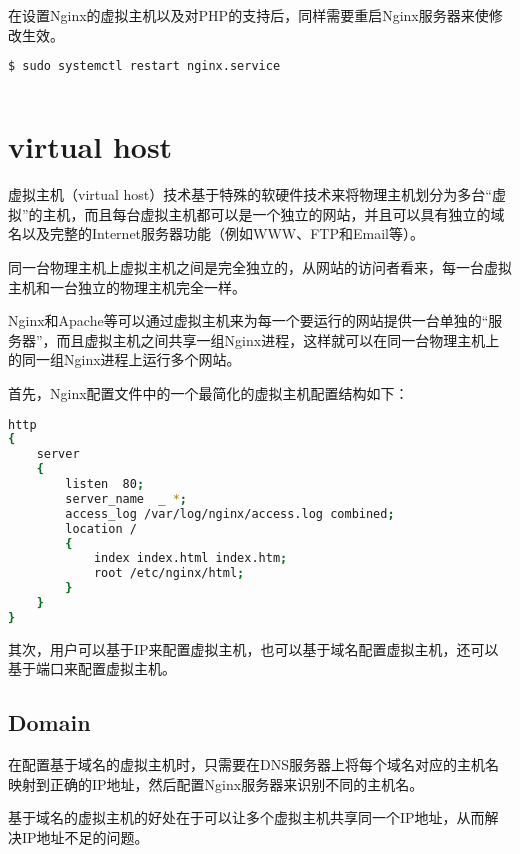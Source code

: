 在设置Nginx的虚拟主机以及对PHP的支持后，同样需要重启Nginx服务器来使修改生效。

\begin{lstlisting}[language=bash]
$ sudo systemctl restart nginx.service
\end{lstlisting}





\begin{lstlisting}[language=bash]

\end{lstlisting}



\section{virtual host}

虚拟主机（virtual host）技术基于特殊的软硬件技术来将物理主机划分为多台“虚拟”的主机，而且每台虚拟主机都可以是一个独立的网站，并且可以具有独立的域名以及完整的Internet服务器功能（例如WWW、FTP和Email等）。

同一台物理主机上虚拟主机之间是完全独立的，从网站的访问者看来，每一台虚拟主机和一台独立的物理主机完全一样。

Nginx和Apache等可以通过虚拟主机来为每一个要运行的网站提供一台单独的“服务器”，而且虚拟主机之间共享一组Nginx进程，这样就可以在同一台物理主机上的同一组Nginx进程上运行多个网站。

首先，Nginx配置文件中的一个最简化的虚拟主机配置结构如下：

\begin{lstlisting}[language=bash]
http
{
	server
	{
		listen  80;
		server_name  _ *;
		access_log /var/log/nginx/access.log combined;
		location /
		{
			index index.html index.htm;
			root /etc/nginx/html;
		}
	}
}
\end{lstlisting}


其次，用户可以基于IP来配置虚拟主机，也可以基于域名配置虚拟主机，还可以基于端口来配置虚拟主机。

\subsection{Domain}


在配置基于域名的虚拟主机时，只需要在DNS服务器上将每个域名对应的主机名映射到正确的IP地址，然后配置Nginx服务器来识别不同的主机名。


基于域名的虚拟主机的好处在于可以让多个虚拟主机共享同一个IP地址，从而解决IP地址不足的问题。


